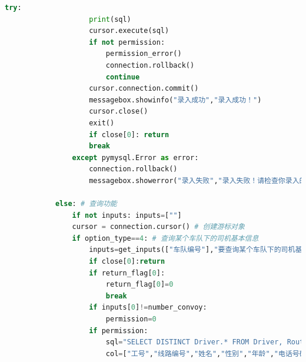 \documentclass {article}
\begin{document}
\begin{lstlisting}[language=python]
                try:
                    print(sql)
                    cursor.execute(sql) 
                    if not permission: 
                        permission_error()
                        connection.rollback()
                        continue
                    cursor.connection.commit()
                    messagebox.showinfo("录入成功","录入成功！")
                    cursor.close()
                    exit()
                    if close[0]: return
                    break
                except pymysql.Error as error:
                    connection.rollback()
                    messagebox.showerror("录入失败","录入失败！请检查你录入的信息是否符合数据要求，并重新录入。")
                
            else: # 查询功能
                if not inputs: inputs=[""]    
                cursor = connection.cursor() # 创建游标对象
                if option_type==4: # 查询某个车队下的司机基本信息
                    inputs=get_inputs(["车队编号"],"要查询某个车队下的司机基本信息，请先输入车队编号：",inputs[:1])
                    if close[0]:return
                    if return_flag[0]:
                        return_flag[0]=0
                        break
                    if inputs[0]!=number_convoy: 
                        permission=0
                    if permission:
                        sql="SELECT DISTINCT Driver.* FROM Driver, Route, Bus, Convoy WHERE Driver.number_route=Route.number_route and Route.number_route=Bus.number_route and Bus.number_convoy=Convoy.number_convoy and Convoy.number_convoy="+inputs[0]+";"
                        col=["工号","线路编号","姓名","性别","年龄","电话号码","家庭住址"]


\end{lstlisting}
\end{document}
